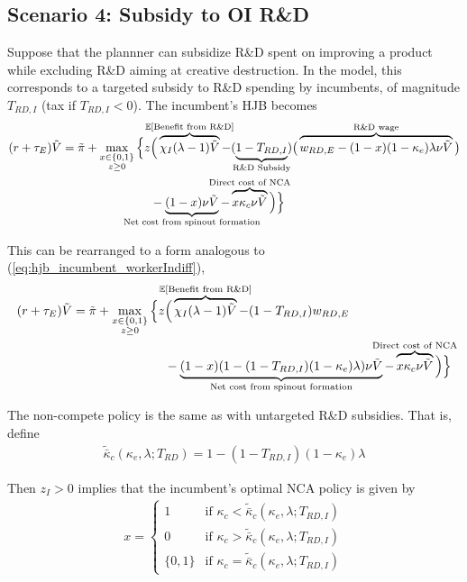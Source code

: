 \documentclass[11pt,english]{article}
\theoremstyle{remark}
\begin{document}
\subsection{Scenario 4: Subsidy to OI R\&D}

Suppose that the plannner can subsidize R\&D spent on improving a product while excluding R\&D aiming at creative destruction. In the model, this corresponds to a targeted subsidy to R\&D spending by incumbents, of magnitude $T_{RD,I}$ (tax if $T_{RD,I} < 0$). The incumbent's HJB becomes
\begin{align}
(r + \tau_E) \tilde{V} = \tilde{\pi} + \max_{\substack{x \in \{0,1\} \\ z \ge 0}} \Big\{z &\Big( \overbrace{\chi_I (\lambda - 1) \tilde{V}}^{\mathclap{\mathbb{E}[\textrm{Benefit from R\&D}]}}- (\underbrace{1-T_{RD,I}}_{\mathclap{\text{R\&D Subsidy}}}) \big( \overbrace{w_{RD,E} - (1-x)(1-\kappa_e)\lambda \nu \tilde{V}}^{\mathclap{\text{R\&D wage}}}\big) \label{eq:hjb_incumbent_RDsubsidyTargeted} \nonumber \\ 
&-  \underbrace{(1-x) \nu \tilde{V}}_{\mathclap{\text{Net cost from spinout formation}}} - \overbrace{x \kappa_{c} \nu \tilde{V}}^{\mathclap{\text{Direct cost of NCA}}}\Big) \Big\} 
\end{align}

This can be rearranged to a form analogous to (\ref{eq:hjb_incumbent_workerIndiff}),
\begin{align}
(r + \tau_E) \tilde{V} = \tilde{\pi} + \max_{\substack{x \in \{0,1\} \\ z \ge 0}} \Big\{z &\Big( \overbrace{\chi_I (\lambda - 1) \tilde{V}}^{\mathclap{\mathbb{E}[\textrm{Benefit from R\&D}]}}- (1-T_{RD,I}) w_{RD,E} \\
&-  \underbrace{(1-x)(1 - (1-T_{RD,I})(1-\kappa_{e})\lambda)\nu \tilde{V}}_{\mathclap{\text{Net cost from spinout formation}}} - \overbrace{x \kappa_{c} \nu \tilde{V}}^{\mathclap{\text{Direct cost of NCA}}}\Big) \Big\} \label{eq:hjb_incumbent_RDsubsidyTargeted_2}
\end{align}

The non-compete policy is the same as with untargeted R\&D subsidies. That is, define
\begin{align}
\tilde{\bar{\kappa}}_c(\kappa_e,\lambda;T_{RD}) = 1 - (1-T_{RD,I})(1-\kappa_e)\lambda
\end{align} 

Then $z_I > 0$ implies that the incumbent's optimal NCA policy is given by 
\begin{align}
x = \begin{cases}
1 & \textrm{if } \kappa_{c} < \tilde{\bar{\kappa}}_c (\kappa_e, \lambda;T_{RD,I}) \\
0 & \textrm{if } \kappa_{c} > \tilde{\bar{\kappa}}_c (\kappa_e, \lambda;T_{RD,I})\\
\{0,1\} & \textrm{if } \kappa_c = \tilde{\bar{\kappa}}_c (\kappa_e, \lambda;T_{RD,I})
\end{cases} \label{eq:nca_policy_RDsubsidyTargeted}
\end{align}
\end{document}

